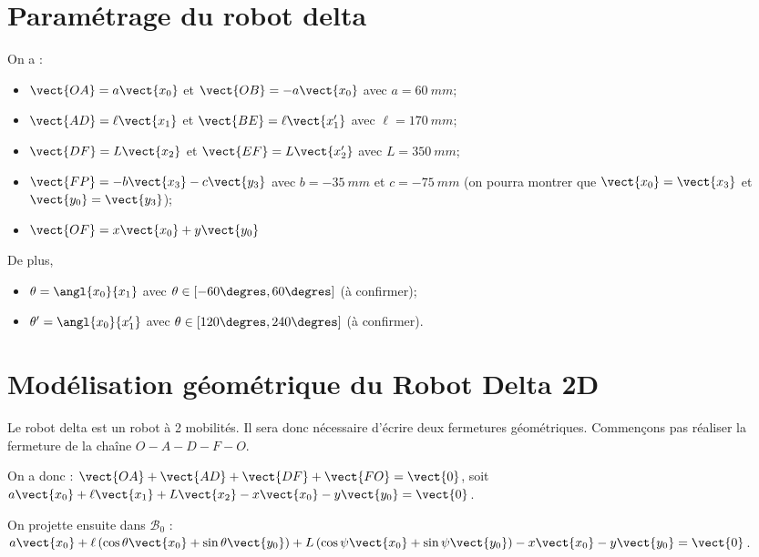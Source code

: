 \documentclass[10pt,fleqn]{article} %
\begin{document}
\graphicspath{{../../../style/png/}{images/}}






\section{Paramétrage du robot delta}

On a  :
\begin{itemize}
\item $\vect{OA} = a\vect{x_0}$ et $\vect{OB} =- a\vect{x_0}$  avec $a =\SI{60}{mm}$;
\item $\vect{AD} = \ell\vect{x_1}$ et $\vect{BE} = \ell\vect{x_1'}$ avec $\ell =\SI{170}{mm}$;
\item $\vect{DF} =  L\vect{x_2}$ et $\vect{EF} = L\vect{x_2'}$ avec $L=\SI{350}{mm}$;
\item $\vect{FP}=-b\vect{x_3}-c\vect{y_3}$ avec $b=-\SI{35}{mm}$ et $c=-\SI{75}{mm}$ 
(on pourra montrer que $\vect{x_0}=\vect{x_3}$ et $\vect{y_0}=\vect{y_3}$);
\item $\vect{OF} = x\vect{x_0} +y\vect{y_0} $
\end{itemize}

De plus, 
\begin{itemize}
\item $\theta  =\angl{x_0}{x_1}$ avec $\theta \in [-60\degres,60\degres]$ (à confirmer);
\item $\theta' =\angl{x_0}{x_1'}$ avec $\theta \in [120\degres,240\degres]$ (à confirmer).
\end{itemize}

\section{Modélisation géométrique du Robot Delta 2D}

Le robot delta est un robot à 2 mobilités. Il sera donc nécessaire d'écrire deux fermetures géométriques. 
Commençons pas réaliser la fermeture de la chaîne $O - A - D - F - O$. 

On a donc : 
$\vect{OA}+\vect{AD}+\vect{DF}+\vect{FO} = \vect{0}$, soit 
$a\vect{x_0}+ \ell\vect{x_1}+L\vect{x_2} -x\vect{x_0} -y\vect{y_0} = \vect{0}$.

On projette ensuite dans $\mathcal{B}_{0}$ :
$a\vect{x_0}+ \ell \left( \cos\theta \vect{x_0} + \sin\theta \vect{y_0} \right)+L\left( \cos\psi \vect{x_0} + \sin\psi\vect{y_0} \right) -x\vect{x_0} -y\vect{y_0} = \vect{0}$. 
\end{document}
